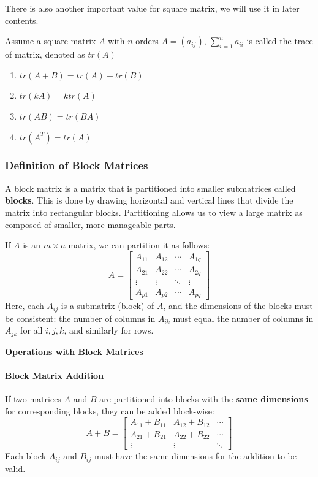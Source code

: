 There is also another important value for square matrix, we will use it in later contents.

\begin{definition}
Assume a square matrix $A$ with $n$ orders $A=(a_{ij})$, $\sum_{i=1}^{n} a_{ii}$ is called the trace of matrix, denoted as $tr(A)$
\end{definition}

\begin{property}
\begin{enumerate}
    \item $tr(A+B) = tr(A) + tr(B)$
    \item $tr(kA) = k tr(A)$
    \item $tr(AB) = tr(BA)$
    \item $tr(A^T) = tr(A)$
\end{enumerate}
\end{property}

\subsubsection*{Definition of Block Matrices}
A block matrix is a matrix that is partitioned into smaller submatrices called \textbf{blocks}. This is done by drawing horizontal and vertical lines that divide the matrix into rectangular blocks. Partitioning allows us to view a large matrix as composed of smaller, more manageable parts.

If \( A \) is an \( m \times n \) matrix, we can partition it as follows:
\[
A = \begin{bmatrix}
    A_{11} & A_{12} & \cdots & A_{1q} \\
    A_{21} & A_{22} & \cdots & A_{2q} \\
    \vdots & \vdots & \ddots & \vdots \\
    A_{p1} & A_{p2} & \cdots & A_{pq}
\end{bmatrix}
\]
Here, each \( A_{ij} \) is a submatrix (block) of \( A \), and the dimensions of the blocks must be consistent: the number of columns in \( A_{ik} \) must equal the number of columns in \( A_{jk} \) for all \( i, j, k \), and similarly for rows.

\textbf{Operations with Block Matrices}

\paragraph*{Block Matrix Addition}
If two matrices \( A \) and \( B \) are partitioned into blocks with the \textbf{same dimensions} for corresponding blocks, they can be added block-wise:
\[
A + B = \begin{bmatrix}
    A_{11} + B_{11} & A_{12} + B_{12} & \cdots \\
    A_{21} + B_{21} & A_{22} + B_{22} & \cdots \\
    \vdots & \vdots & \ddots
\end{bmatrix}
\]
Each block \( A_{ij} \) and \( B_{ij} \) must have the same dimensions for the addition to be valid.

